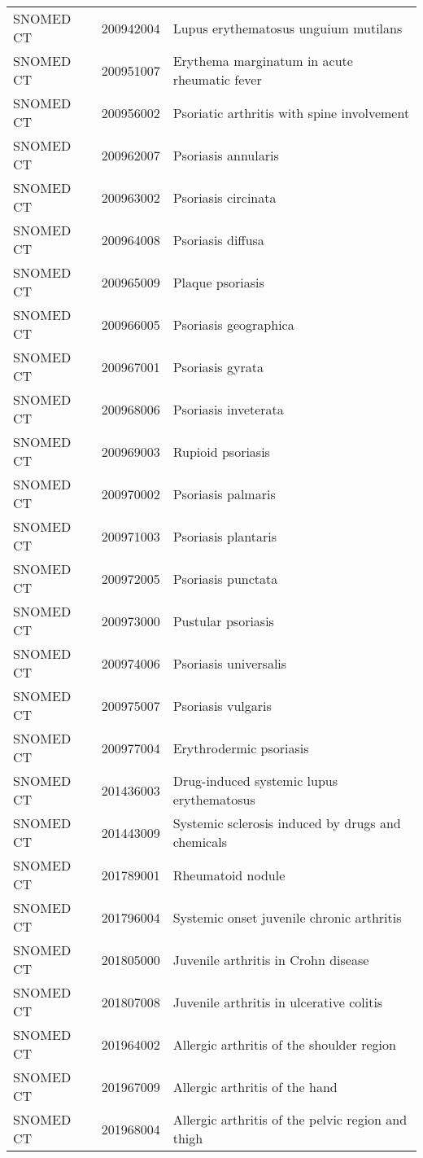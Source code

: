 \begin{longtable}{p{}p{}p{}}
  SNOMED CT & 200942004 & Lupus erythematosus unguium mutilans \\ 
  SNOMED CT & 200951007 & Erythema marginatum in acute rheumatic fever \\ 
  SNOMED CT & 200956002 & Psoriatic arthritis with spine involvement \\ 
  SNOMED CT & 200962007 & Psoriasis annularis \\ 
  SNOMED CT & 200963002 & Psoriasis circinata \\ 
  SNOMED CT & 200964008 & Psoriasis diffusa \\ 
  SNOMED CT & 200965009 & Plaque psoriasis \\ 
  SNOMED CT & 200966005 & Psoriasis geographica \\ 
  SNOMED CT & 200967001 & Psoriasis gyrata \\ 
  SNOMED CT & 200968006 & Psoriasis inveterata \\ 
  SNOMED CT & 200969003 & Rupioid psoriasis \\ 
  SNOMED CT & 200970002 & Psoriasis palmaris \\ 
  SNOMED CT & 200971003 & Psoriasis plantaris \\ 
  SNOMED CT & 200972005 & Psoriasis punctata \\ 
  SNOMED CT & 200973000 & Pustular psoriasis \\ 
  SNOMED CT & 200974006 & Psoriasis universalis \\ 
  SNOMED CT & 200975007 & Psoriasis vulgaris \\ 
  SNOMED CT & 200977004 & Erythrodermic psoriasis \\ 
  SNOMED CT & 201436003 & Drug-induced systemic lupus erythematosus \\ 
  SNOMED CT & 201443009 & Systemic sclerosis induced by drugs and chemicals \\ 
  SNOMED CT & 201789001 & Rheumatoid nodule \\ 
  SNOMED CT & 201796004 & Systemic onset juvenile chronic arthritis \\ 
  SNOMED CT & 201805000 & Juvenile arthritis in Crohn disease \\ 
  SNOMED CT & 201807008 & Juvenile arthritis in ulcerative colitis \\ 
  SNOMED CT & 201964002 & Allergic arthritis of the shoulder region \\ 
  SNOMED CT & 201967009 & Allergic arthritis of the hand \\ 
  SNOMED CT & 201968004 & Allergic arthritis of the pelvic region and thigh \\ 

\end{longtable}
